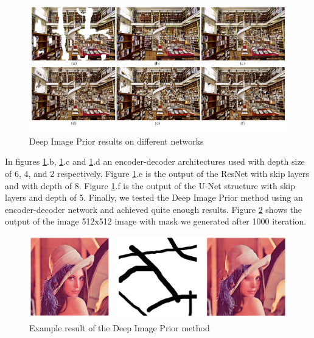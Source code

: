\begin{figure}[h!]
    \centering
    \includegraphics[width=13cm]{figures/chapter4/imprior4.png}
    \caption{Deep Image Prior results on different networks \cite{deep_image_prior}}
    \label{fig:prior_multimodels}
\end{figure}

In figures \ref{fig:prior_multimodels}.b, \ref{fig:prior_multimodels}.c and \ref{fig:prior_multimodels}.d an encoder-decoder architectures used with depth size of 6, 4, and 2 respectively. Figure \ref{fig:prior_multimodels}.e is the output of the ResNet with skip layers and with depth of 8. Figure \ref{fig:prior_multimodels}.f is the output of the U-Net structure with skip layers and depth of 5. Finally, we tested the Deep Image Prior method using an encoder-decoder network and achieved quite enough results. Figure \ref{fig:prior_lenna} shows the output of the image 512x512 image with mask we generated after 1000 iteration.

\begin{figure}[h!]
    \centering
    \includegraphics[width=14cm]{figures/chapter4/impriorout.png}
    \vspace*{3mm}
    \caption{Example result of the Deep Image Prior method}
    \label{fig:prior_lenna}
\end{figure}
